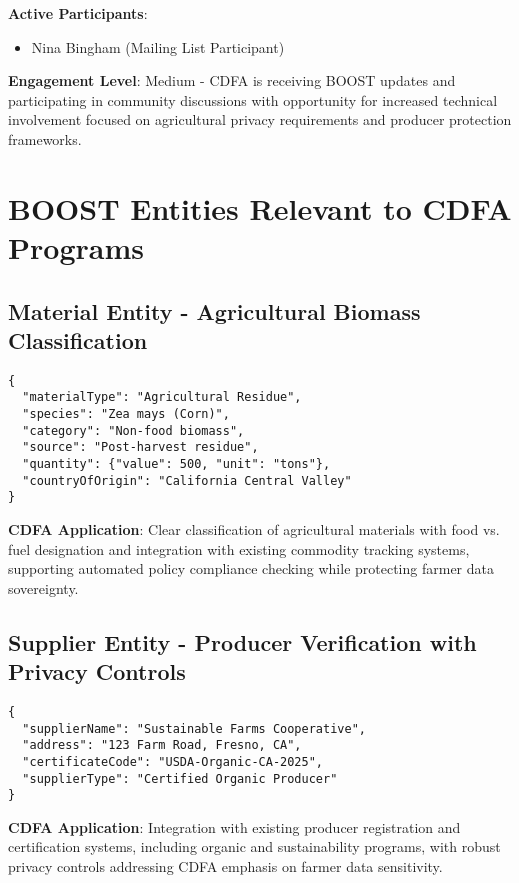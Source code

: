 \documentclass[title=small,preset=opensansnote,par=skip]{article}
\begin{document}
\textbf{Active Participants}:
\begin{itemize}
\item Nina Bingham (Mailing List Participant)
\end{itemize}

\textbf{Engagement Level}: Medium - CDFA is receiving BOOST updates and participating in community discussions with opportunity for increased technical involvement focused on agricultural privacy requirements and producer protection frameworks.
\section{BOOST Entities Relevant to CDFA Programs}
\label{sec:orga426ce2}

\subsection{Material Entity - Agricultural Biomass Classification}
\label{sec:org26f5184}
\begin{verbatim}
{
  "materialType": "Agricultural Residue",
  "species": "Zea mays (Corn)",
  "category": "Non-food biomass",
  "source": "Post-harvest residue",
  "quantity": {"value": 500, "unit": "tons"},
  "countryOfOrigin": "California Central Valley"
}
\end{verbatim}
\textbf{CDFA Application}: Clear classification of agricultural materials with food vs. fuel designation and integration with existing commodity tracking systems, supporting automated policy compliance checking while protecting farmer data sovereignty.
\subsection{Supplier Entity - Producer Verification with Privacy Controls}
\label{sec:orgceefc00}
\begin{verbatim}
{
  "supplierName": "Sustainable Farms Cooperative",
  "address": "123 Farm Road, Fresno, CA",
  "certificateCode": "USDA-Organic-CA-2025",
  "supplierType": "Certified Organic Producer"
}
\end{verbatim}
\textbf{CDFA Application}: Integration with existing producer registration and certification systems, including organic and sustainability programs, with robust privacy controls addressing CDFA emphasis on farmer data sensitivity.
\end{document}
